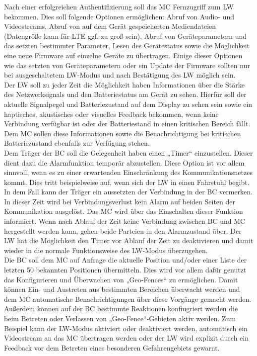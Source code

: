 \documentclass[thesis.tex]{subfiles}
\begin{document}
Nach einer erfolgreichen Authentifizierung soll das MC Fernzugriff zum LW bekommen.
Dies soll folgende Optionen ermöglichen: Abruf von Audio- und Videostreams, Abruf von auf dem Gerät gespeicherten Mediendateien
(Datengröße kann für LTE ggf. zu groß sein), Abruf von Geräteparametern und das setzten bestimmter Parameter, Lesen des Gerätestatus
sowie die Möglichkeit eine neue Firmware auf einzelne Geräte zu übertragen.
Einige dieser Optionen wie das setzten von Geräteparametern oder ein Update der Firmware sollten nur bei ausgeschaltetem LW-Modus
und nach Bestätigung des LW möglich sein.
\\

Der LW soll zu jeder Zeit die Möglichkeit haben Informationen über die Stärke des Netzwerksignals und den Batteriestatus am Gerät zu sehen.
Hierfür soll der aktuelle Signalpegel und Batteriezustand auf dem Display zu sehen sein sowie ein haptisches, akustisches oder visuelles
Feedback bekommen, wenn keine Verbindung verfügbar ist oder der Batteriestand in einen kritischen Bereich fällt.
Dem MC sollen diese Informationen sowie die Benachrichtigung bei kritischen Batteriezustand ebenfalls zur Verfügung stehen.
\\

Dem Träger der BC soll die Gelegenheit haben einen „Timer“ einzustellen.
Dieser dient dazu die Alarmfunktion temporär abzustellen.
Diese Option ist vor allem sinnvoll, wenn es zu einer erwartenden Einschränkung des Kommunikationsnetzes kommt.
Dies tritt beispielweise auf, wenn sich der LW in einen Fahrstuhl begibt.
In dem Fall kann der Träger ein aussetzten der Verbindung in der BC vermerken.
In dieser Zeit wird bei Verbindungsverlust kein Alarm auf beiden Seiten der Kommunikation ausgelöst.
Das MC wird über das Einschalten dieser Funktion informiert.
Wenn nach Ablauf der Zeit keine Verbindung zwischen BC und MC hergestellt werden kann, gehen beide Parteien in den Alarmzustand über.
Der LW hat die Möglichkeit den Timer vor Ablauf der Zeit zu deaktivieren und damit wieder in die normale Funktionsweise des LW-Modus überzugehen.
\\

Die BC soll dem MC auf Anfrage die aktuelle Position und/oder einer Liste der letzten 50 bekannten Positionen übermitteln.
Dies wird vor allem dafür genutzt das Konfigurieren und Überwachen von „Geo-Fences“ zu ermöglichen.
Damit können Ein- und Austreten aus bestimmten Bereichen überwacht werden und dem MC automatische Benachrichtigungen
über diese Vorgänge gemacht werden.
Außerdem können auf der BC bestimmte Reaktionen konfiugriert werden die beim Betreten oder Verlassen von „Geo-Fence“-Gebieten aktiv werden.
Zum Beispiel kann der LW-Modus aktiviert oder deaktiviert werden, automatisch ein Videostream an das MC übertragen werden
oder der LW wird explizit durch ein Feedback vor dem Betreten eines besonderen Gefahrengebiets gewarnt.
\\
\end{document}
